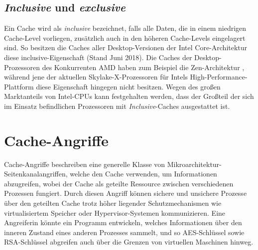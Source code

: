 




\subsection{\textit{Inclusive} und \textit{exclusive}}
Ein Cache wird als \textit{inclusive} bezeichnet, falls alle Daten, die in einem niedrigen Cache-Level vorliegen, zusätzlich auch in den höheren Cache-Levels eingelagert sind. 
So besitzen die Caches aller Desktop-Versionen der Intel Core-Architektur diese inclusive-Eigenschaft (Stand Juni 2018).
Die Caches der Desktop-Prozessoren des Konkurrenten AMD haben zum Beispiel die Zen-Architektur \cite{CacheRyzen}, während jene der aktuellen Skylake-X-Prozessoren \cite{CacheSkylakeX} für Intels High-Performance-Plattform diese Eigenschaft hingegen nicht besitzen.
Wegen des großen Marktanteils von Intel-CPUs kann festgehalten werden, dass der Großteil der sich im Einsatz befindlichen Prozessoren mit \textit{Inclusive}-Caches ausgestattet ist.

\section{Cache-Angriffe}

Cache-Angriffe beschreiben eine generelle Klasse von Mikroarchitektur-Seitenkanalangriffen, welche den Cache verwenden, um Informationen abzugreifen, wobei der Cache als geteilte Ressource zwischen verschiedenen Prozessen fungiert. Durch diesen Angriff können sichere und unsichere Prozesse über den geteilten Cache trotz höher liegender Schutzmechanismen wie virtualisiertem Speicher oder Hypervisor-Systemen kommunizieren. 
Eine Angreiferin könnte ein Programm entwickeln, welches Informationen über den inneren Zustand eines anderen Prozesses sammelt, und so AES-Schlüssel \cite{BernsteinAES} sowie RSA-Schlüssel \cite{CacheAttackRSA} abgreifen auch über die Grenzen von virtuellen Maschinen hinweg.


